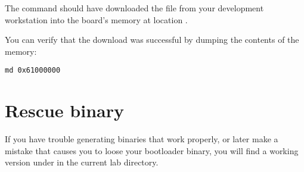 The  command should have downloaded the
 file from your development workstation into
the board's memory at location .

You can verify that the download was successful by dumping the
contents of the memory:

\begin{verbatim}
md 0x61000000
\end{verbatim}

\section{Rescue binary}

If you have trouble generating binaries that work properly, or later
make a mistake that causes you to loose your bootloader binary, you
will find a working version under  in the current lab
directory.
